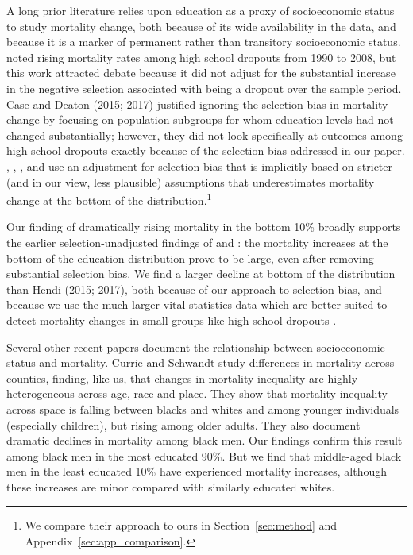 \documentclass[12pt,letterpaper]{article}
\numberwithin{equation}{section}
\begin{document}
A long prior literature relies upon education as a proxy of
socioeconomic status to study mortality change, both because of its
wide availability in the data, and because it is a marker of permanent
rather than transitory socioeconomic status.  \citet{Olshansky2012}
noted rising mortality rates among high school dropouts from 1990 to
2008, but this work attracted debate because it did not adjust for the
substantial increase in the negative selection associated with being a
dropout over the sample period. Case and Deaton (2015; 2017) justified
ignoring the selection bias in mortality change by focusing on
population subgroups for whom education levels had not changed
substantially; however, they did not look specifically at outcomes
among high school dropouts exactly because of the selection bias
addressed in our paper. \citet{Meara2008}, \citet{Bound2015}, 
\citet{Hendi2015}, and \citet{Leive2020} use an adjustment for selection bias that is implicitly based on stricter (and in our view, less plausible) assumptions that underestimates mortality change at the bottom of the distribution.\footnote{We compare their approach to ours in Section~\ref{sec:method} and Appendix~\ref{sec:app_comparison}.}

Our finding of dramatically rising mortality in the bottom 10\% broadly supports the earlier selection-unadjusted findings of \citet{Olshansky2012} and \citet{Sasson2016}: the mortality increases at the bottom of the education distribution prove to be large, even after removing substantial selection bias. We find a larger decline at bottom of the distribution than Hendi (2015; 2017), both because of our approach to selection bias, and because we use the much larger vital statistics data which are better suited to detect mortality changes in small groups like high school dropouts \citep{Sasson2017}.

Several other recent papers document the relationship between
socioeconomic status and mortality. Currie and Schwandt
\citeyearpar{Currie2016b,Currie2016a} study differences in mortality
across counties, finding, like us, that changes in mortality
inequality are highly heterogeneous across age, race and place. They
show that mortality inequality across space is falling between blacks
and whites and among younger individuals (especially children), but
rising among older adults. They also document dramatic declines in
mortality among black men. Our findings confirm this result among
black men in the most educated 90\%.  But we find that middle-aged
black men in the least educated 10\% have experienced mortality
increases, although these increases are minor compared with
similarly educated whites.
\end{document}
